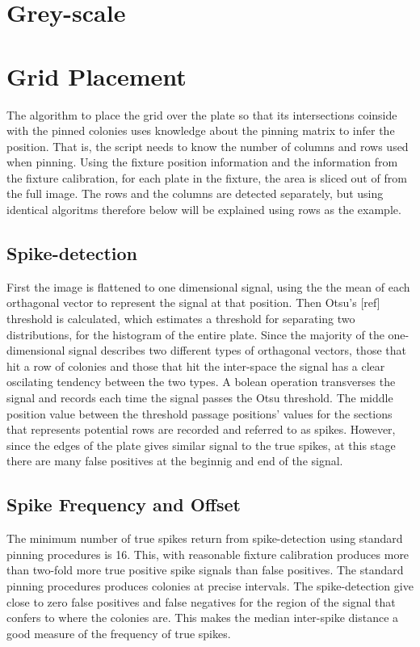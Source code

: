 \documentclass{article}
\begin{document}
\section{Grey-scale}

\section{Grid Placement}

The algorithm to place the grid over the plate so that its intersections 
coinside with the pinned colonies uses knowledge about the pinning matrix
to infer the position. 
That is, the script needs to know the number of columns and rows used when
pinning.
Using the fixture position information and the information from the fixture
calibration, for each plate in the fixture, the area is sliced out of from the 
full image. 
The rows and the columns are detected separately, but using identical algoritms
therefore below will be explained using rows as the example.

\subsection{Spike-detection}

First the image is flattened to one dimensional signal, using the the mean of
each orthagonal vector to represent the signal at that position.
Then Otsu's [ref] threshold is calculated, which estimates a threshold for
separating two distributions, for the histogram of the entire plate. 
Since the majority of the one-dimensional signal describes two different types
of orthagonal vectors, those that hit a row of colonies and those that hit the
inter-space the signal has a clear oscilating tendency between the two types.
A bolean operation transverses the signal and records each time the signal
passes the Otsu threshold.
The middle position value between the threshold passage positions' values for
the sections that represents potential rows are recorded and referred to as 
spikes. However, since the edges of the plate gives similar signal to the 
true spikes, at this stage there are many false positives at the beginnig and
end of the signal.

\subsection{Spike Frequency and Offset}

The minimum number of true spikes return from spike-detection using standard
pinning procedures is 16.
This, with reasonable fixture calibration produces more than two-fold more 
true positive spike signals than false positives. 
The standard pinning procedures produces colonies at precise intervals.
The spike-detection give close to zero false positives and false negatives 
for the region of the signal that confers to where the colonies are.
This makes the median inter-spike distance a good measure of the frequency
of true spikes.
\end{document}
